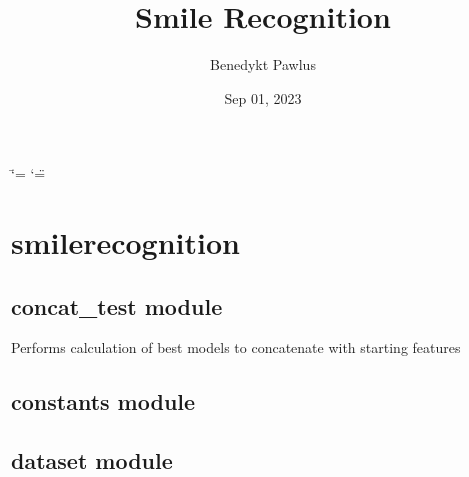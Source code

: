 \documentclass[letterpaper,10pt,english]{sphinxmanual}
\title{Smile Recognition}
\date{Sep 01, 2023}
\author{Benedykt Pawlus}
\begin{document}
\ifdefined\shorthandoff
  \ifnum\catcode`\=\string=\active\shorthandoff{=}\fi
  \ifnum\catcode`\"=\active{}\fi
\fi

\pagestyle{empty}
\sphinxmaketitle
\pagestyle{plain}
\sphinxtableofcontents
\pagestyle{normal}
\label{\detokenize{index::doc}}


\sphinxstepscope


\chapter{smilerecognition}
\label{\detokenize{modules:smilerecognition}}\label{\detokenize{modules::doc}}
\sphinxstepscope


\section{concat\_test module}
\label{\detokenize{concat_test:module-concat_test}}\label{\detokenize{concat_test:concat-test-module}}\label{\detokenize{concat_test::doc}}

\begin{fulllineitems}
\label{\detokenize{concat_test:concat_test.main}}
\pysigstartsignatures
{}
\pysigstopsignatures
\sphinxAtStartPar
Performs calculation of best models to concatenate with starting features

\end{fulllineitems}


\sphinxstepscope


\section{constants module}
\label{\detokenize{constants:module-constants}}\label{\detokenize{constants:constants-module}}\label{\detokenize{constants::doc}}
\sphinxstepscope


\section{dataset module}
\label{\detokenize{dataset:module-dataset}}\label{\detokenize{dataset:dataset-module}}\label{\detokenize{dataset::doc}}
\end{document}
